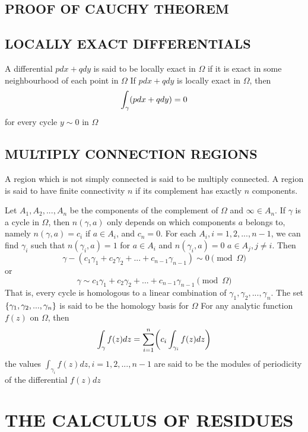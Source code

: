 \documentclass{report}
\begin{document}
\subsection{PROOF OF CAUCHY THEOREM}

\subsection{LOCALLY EXACT DIFFERENTIALS}

\begin{theorem}
    A differential $pdx + qdy$ is said to be locally exact in $\Omega$ if it is exact in some neighbourhood of each point in $\Omega$
    If $pdx + qdy$ is locally exact in $\Omega$, then
    \[
        \int_\gamma (pdx + qdy) = 0
    \]
    for every cycle $y \sim 0$ in $\Omega$
\end{theorem}

\subsection{MULTIPLY CONNECTION REGIONS}

\begin{definition}
    A region which is not simply connected is said to be multiply connected. A region is said to have finite connectivity $n$ if its complement has exactly $n$ components.
\end{definition}

\begin{proposition}
    Let $A_1, A_2, ..., A_n$ be the components of the complement of $\Omega$ and $\infty \in A_n$. If $\gamma$ is a cycle in $\Omega$, then $n(\gamma, a)$ only depends on which components $a$ belongs to, namely $n(\gamma, a) = c_i$ if $a \in A_i$, and $c_n = 0$. For each $A_i, i = 1, 2, ..., n-1$, we can find $\gamma_i$ such that $n(\gamma_i, a) = 1$ for $a \in A_i$ and $n(\gamma_i, a) = 0$ $a \in A_j, j \neq i$. Then 
    \[
        \gamma - (c_1 \gamma_1 + c_2 \gamma_2 + ... + c_{n-1} \gamma_{n-1}) \sim 0 \pmod{\Omega}
    \]
    or
    \[
        \gamma \sim c_1 \gamma_1 + c_2 \gamma_2 + ... + c_{n-1} \gamma_{n-1} \pmod{\Omega}
    \]
    That is, every cycle is homologous to a linear combination of $\gamma_1, \gamma_2, ..., \gamma_n$. The set $\{\gamma_1, \gamma_2, ..., \gamma_n\}$ is said to be the homology basis for $\Omega$
    For any analytic function $f(z)$ on $\Omega$, then
    \[
        \int_\gamma f(z)dz = \sum_{i=1}^n \tuple*{c_i \int_{\gamma_i} f(z)dz}
    \]
    the values $\int_{\gamma_i} f(z)dz, i=1, 2, ..., n-1$ are said to be the modules of periodicity of the differential $f(z)dz$
\end{proposition}

\section{THE CALCULUS OF RESIDUES}
\end{document}
